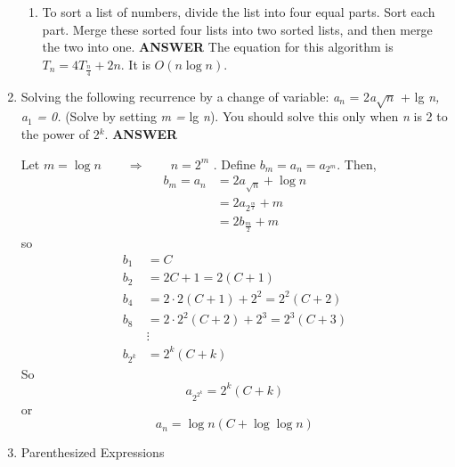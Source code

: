 \documentclass{article}
\newcommand{\fr}[2]{\frac{#1}{#2}}
\begin{document}
\begin{enumerate}
\begin{enumerate}
\item To sort a list of numbers, divide the list into four equal
parts. Sort each part. Merge these sorted four lists into two
sorted lists, and then merge the two into one. \vskip 10pt
\textbf{ANSWER}
 The equation for this algorithm is $T_n = 4T_\frac{n}{4} + 2n$. It is $O(n \log n)$. \\

\end{enumerate}

\item
 Solving the following recurrence by a change of variable:
\textit{a}$_{\mathit{n}}$ = 2\textit{a}\ensuremath{\sqrt{n}} + lg
\textit{n, a}$_{\mathit{1}}$ \textit{= 0.} (Solve by setting
\textit{m =} lg \textit{n}). You should solve this only when
\textit{n} is 2 to the power of 2$^{\mathit{k}}$. \vskip 10pt
\vskip 10pt \textbf{ANSWER}

Let $m = \log n \qquad \Rightarrow \qquad n = 2^m$ . Define $b_m =
a_n = a_{2^m}$. Then,
\begin{align*}
b_m = a_n & = 2 a_{\sqrt{n}} + \log n \\
          & = 2 a_{2^{\fr{m}{2}}} + m \\
          & = 2 b_{\fr{m}{2}} + m
\end{align*}
so
\begin{align*}
b_1 & = C \\
b_2 & = 2C + 1 = 2(C+1) \\
b_4 & = 2\cdot 2 (C + 1 ) + 2^2 = 2^2(C+ 2) \\
b_8 & = 2 \cdot 2^2 (C + 2) + 2^3 = 2^3 (C + 3) \\
    & \vdots \\
b_{2^k} & = 2^k (C + k)
\end{align*}
So
\[
a_{2^{2^k}} = 2^k ( C + k)
\]
or
\[
a_n = \log n ( C + \log \log n)
\]

\item Parenthesized Expressions


\end{enumerate}
\end{document}
